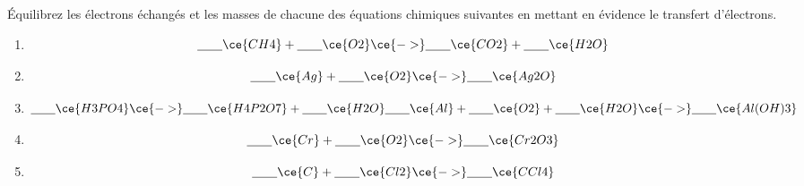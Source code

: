 \documentclass[
  11pt,
  french,
  a4paper,
  openany]{book}
\providecommand{\tightlist}{%
  \setlength{\itemsep}{0pt}\setlength{\parskip}{0pt}}
\begin{document}
\begin{Exercise}

Équilibrez les électrons échangés et les masses de chacune des équations chimiques suivantes en mettant en évidence le transfert d'électrons.

\begin{enumerate}
\def\labelenumi{\alph{enumi}.}
\tightlist
\item
  \[
  \underline{\hspace{2em}} \ce{CH4} + \underline{\hspace{2em}} \ce{O2} \ce{->} \underline{\hspace{2em}} \ce{CO2} + \underline{\hspace{2em}} \ce{H2O}
  \]
  \vspace{1em}
\item
  \[
  \underline{\hspace{2em}} \ce{Ag} + \underline{\hspace{2em}} \ce{O2} \ce{->} \underline{\hspace{2em}} \ce{Ag2O}
  \]
  \vspace{1em}
\item
  \[
  \underline{\hspace{2em}} \ce{H3PO4} \ce{->} \underline{\hspace{2em}} \ce{H4P2O7} + \underline{\hspace{2em}} \ce{H2O}
  \underline{\hspace{2em}} \ce{Al} + \underline{\hspace{2em}} \ce{O2} + \underline{\hspace{2em}} \ce{H2O} \ce{->} \underline{\hspace{2em}} \ce{Al(OH)3}
  \]
  \vspace{1em}
\item
  \[
  \underline{\hspace{2em}} \ce{Cr} + \underline{\hspace{2em}} \ce{O2} \ce{->} \underline{\hspace{2em}} \ce{Cr2O3}
  \]
  \vspace{1em}
\item
  \[
  \underline{\hspace{2em}} \ce{C} + \underline{\hspace{2em}} \ce{Cl2} \ce{->} \underline{\hspace{2em}} \ce{CCl4}
  \]
  \vspace{1em}
\end{enumerate}


\end{Exercise}
\end{document}
